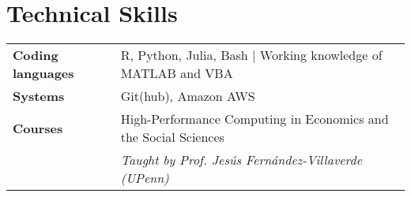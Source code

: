 \documentclass[11pt, a4paper]{article}
\begin{document}

 \section*{Technical Skills}
 \begin{tabular}{ll}
    \textbf{Coding languages} & R, Python, Julia, Bash $|$ Working knowledge of MATLAB and VBA \\
    \textbf{Systems} & Git(hub), Amazon AWS \\
    \textbf{Courses} & High-Performance Computing in Economics and the Social Sciences \\
    & \textit{Taught by Prof. Jesús Fernández-Villaverde (UPenn)} \\
     
 \end{tabular}
 
\end{document}
